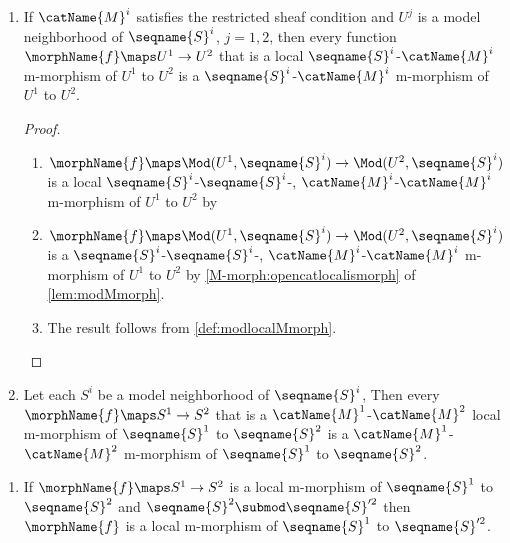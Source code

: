 \documentclass{article}
\begin{document}
\begin{corollary}
\begin{enumerate}
\begin{proof}
Since $\morphName{f}$ is a
$\seqname{S}^1$-$\seqname{S}^2$-$\catName{M}^1$-$\catName{M}^2$
m-morphism of $S^1$ to $S^2$ then $\morphName{f}$ is a local
$\seqname{S}^1$-$\seqname{S}^2$-$\catName{M}^1$-$\catName{M}^2$
m-morphism of $S^1$ to $S^2$.
\end{proof}

\item
\label{M-morph:subcatlocalismorph}
If $\catName{M}^i$ satisfies the restricted sheaf condition and $U^j$ is
a model neighborhood of $\seqname{S}^i$, $j=1,2$, then every function
$\morphName{f} \maps U^1 \to U^2$ that is a local
$\seqname{S}^i$-$\catName{M}^i$ m-morphism of $U^1$ to $U^2$ is a
$\seqname{S}^i$-$\catName{M}^i$ m-morphism of $U^1$ to $U^2$.

\begin{proof}
\leavevmode
\begin{enumerate}
\item
$
  \morphName{f} \maps
  \Mod(U^1,\seqname{S}^i) \to
  \Mod(U^2,\seqname{S}^i)
$
is a local
\nobreaks%
  {
    {$\seqname{S}^i$-$\seqname{S}^i$-},
    {$\catName{M}^i$-$\catName{M}^i$}
  }
m-morphism of $U^1$ to $U^2$ by 

\item
$
  \morphName{f} \maps
  \Mod(U^1,\seqname{S}^i) \to
  \Mod(U^2,\seqname{S}^i)
$
is a
\nobreaks%
  {
    {$\seqname{S}^i$-$\seqname{S}^i$-},
    {$\catName{M}^i$-$\catName{M}^i$}
  }
m-morphism of $U^1$ to $U^2$ by \cref{M-morph:opencatlocalismorph} of
{
  \showlabelsinline
  \cref{lem:modMmorph}.
}

\item
The result follows from \cref{def:modlocalMmorph}.
\end{enumerate}
\end{proof}

\item
\label{M-morph:catlocalismorph}
Let each $S^i$ be a model neighborhood of $\seqname{S}^i$, Then every
$\morphName{f} \maps S^1 \to S^2$ that is a
$\catName{M}^1$-$\catName{M}^2$ local m-morphism of $\seqname{S}^1$ to
$\seqname{S}^2$ is a $\catName{M}^1$-$\catName{M}^2$ m-morphism
of $\seqname{S}^1$ to $\seqname{S}^2$.

\end{enumerate}

\begin{enumerate}
\item
If $\morphName{f} \maps S^1 \to S^2$ is a local m-morphism of
$\seqname{S}^1$ to $\seqname{S}^2$ and
$\seqname{S}^2 \submod \seqname{S}'^2$ then
$\morphName{f}$ is a local m-morphism of $\seqname{S}^1$ to
$\seqname{S}'^2$.


\end{enumerate}
\end{corollary}
\end{document}
